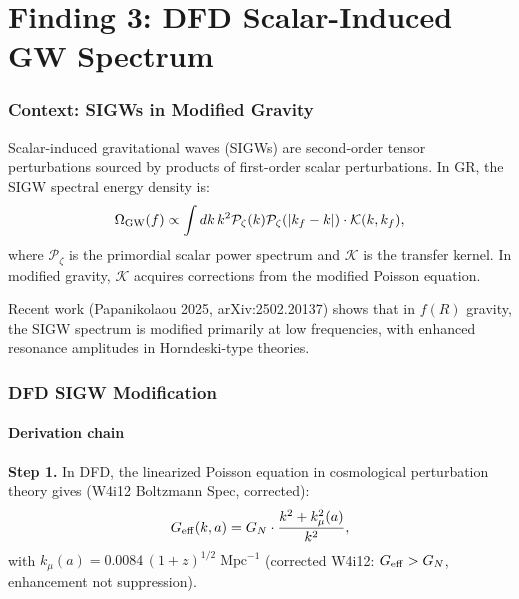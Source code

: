 \documentclass[11pt]{article}
\newcommand{\Geff}{G_{\rm eff}}
\newcommand{\kmu}{k_\mu}
\begin{document}
\part{Finding 3: DFD Scalar-Induced GW Spectrum}
\label{part:SIGW}

\section{Context: SIGWs in Modified Gravity}

Scalar-induced gravitational waves (SIGWs) are second-order tensor
perturbations sourced by products of first-order scalar perturbations.
In GR, the SIGW spectral energy density is:
\begin{equation}
\Omega_{\rm GW}(f) \propto \int dk\,k^2 \mathcal{P}_\zeta(k)
\mathcal{P}_\zeta(|k_f - k|) \cdot \mathcal{K}(k, k_f),
\end{equation}
where $\mathcal{P}_\zeta$ is the primordial scalar power spectrum and
$\mathcal{K}$ is the transfer kernel. In modified gravity, $\mathcal{K}$
acquires corrections from the modified Poisson equation.

Recent work (Papanikolaou 2025, arXiv:2502.20137) shows that in $f(R)$
gravity, the SIGW spectrum is modified primarily at low frequencies,
with enhanced resonance amplitudes in Horndeski-type theories.

\section{DFD SIGW Modification}

\subsection{Derivation chain}

\textbf{Step 1.} In DFD, the linearized Poisson equation in
cosmological perturbation theory gives (W4i12 Boltzmann Spec, corrected):
\begin{equation}
\Geff(k,a) = G_N \cdot \frac{k^2 + \kmu^2(a)}{k^2},
\end{equation}
with $\kmu(a) = 0.0084\,(1+z)^{1/2}\;\text{Mpc}^{-1}$ (corrected
W4i12: $\Geff > G_N$, enhancement not suppression).
\end{document}
